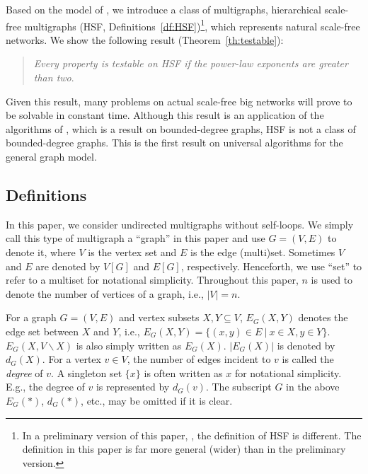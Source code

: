 \documentclass[11pt]{article}
\begin{document}
Based on the model of \cite{Uno-Watanabe_ScaleFree}, we introduce a class of multigraphs, 
hierarchical scale-free multigraphs (HSF, Definitions~\ref{df:HSF})\footnote{
In a preliminary version of this paper, \cite{ScalefreeTest_itohiro15_arXiv}, 
the definition of HSF is different.  
The definition in this paper is far more general (wider) than in the preliminary version. 
}, 
which represents natural scale-free networks. 
We show the following result (Theorem~\ref{th:testable}): 

\begin{quote}
{\em Every property is testable on HSF if the power-law exponents are greater than two}.  
\end{quote}

Given this result, many problems on actual scale-free big networks will prove to be solvable in constant time. 
Although this result is an application of the algorithms of \cite{NS_Testable_SJCOMP13},  
which is a result on bounded-degree graphs, 
HSF is not a class of bounded-degree graphs. 
This is the first result on universal algorithms for the general graph model. 




 













\subsection{Definitions}

In this paper, we consider undirected multigraphs without self-loops.  
We simply call this type of multigraph a ``graph'' in this paper 
and use $G = (V,E)$ to denote it, 
where $V$ is the vertex set and $E$ is the edge (multi)set. 
Sometimes $V$ and $E$ are denoted by $V[G]$ and $E[G]$, respectively. 
Henceforth, we use ``set'' to refer to a multiset for notational simplicity. 
Throughout this paper, $n$ is used to denote the number of vertices of 
a graph, i.e., $|V| = n$. 





For a graph $G = (V,E)$ and vertex subsets $X,Y \subseteq V$, 
 $E_G(X,Y)$ denotes the edge set between $X$ and $Y$, i.e., 
 $E_G(X,Y) = \{ (x,y) \in E ~|~ x \in X, y \in Y \}$. 
 $E_G(X,V \backslash X)$ is also simply written as $E_G(X)$. 
$|E_G(X)|$ is denoted by $d_G(X)$. 
For a vertex $v \in V$, the number of edges incident to $v$ is called the {\em degree} of $v$.  
A singleton set $\{ x \}$ is often written as $x$ for notational simplicity. 
E.g., the degree of $v$ is represented by $d_G(v)$.   
The subscript $G$ in the above $E_G(*)$, $d_G(*)$, etc., 
may be omitted if it is clear. 
\end{document}
